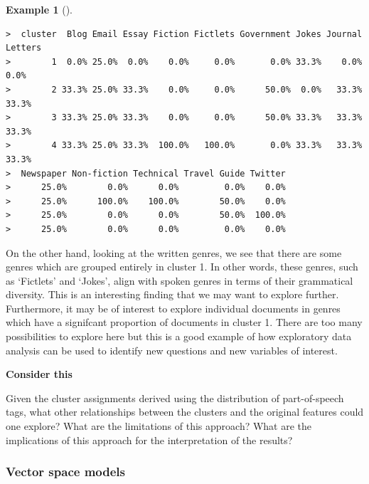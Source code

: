 \documentclass[
  letterpaper,
  DIV=11,
  numbers=noendperiod]{scrreport}
\theoremstyle{definition}
\newtheorem{example}{Example}[chapter]
\theoremstyle{remark}
\begin{document}
\begin{example}[]
\begin{verbatim}
>  cluster  Blog Email Essay Fiction Fictlets Government Jokes Journal Letters
>        1  0.0% 25.0%  0.0%    0.0%     0.0%       0.0% 33.3%    0.0%    0.0%
>        2 33.3% 25.0% 33.3%    0.0%     0.0%      50.0%  0.0%   33.3%   33.3%
>        3 33.3% 25.0% 33.3%    0.0%     0.0%      50.0% 33.3%   33.3%   33.3%
>        4 33.3% 25.0% 33.3%  100.0%   100.0%       0.0% 33.3%   33.3%   33.3%
>  Newspaper Non-fiction Technical Travel Guide Twitter
>      25.0%        0.0%      0.0%         0.0%    0.0%
>      25.0%      100.0%    100.0%        50.0%    0.0%
>      25.0%        0.0%      0.0%        50.0%  100.0%
>      25.0%        0.0%      0.0%         0.0%    0.0%
\end{verbatim}

\end{example}

On the other hand, looking at the written genres, we see that there are
some genres which are grouped entirely in cluster 1. In other words,
these genres, such as `Fictlets' and `Jokes', align with spoken genres
in terms of their grammatical diversity. This is an interesting finding
that we may want to explore further. Furthermore, it may be of interest
to explore individual documents in genres which have a signifcant
proportion of documents in cluster 1. There are too many possibilities
to explore here but this is a good example of how exploratory data
analysis can be used to identify new questions and new variables of
interest.

\begin{tcolorbox}[enhanced jigsaw, leftrule=.75mm, bottomrule=.15mm, opacityback=0, breakable, left=2mm, colback=white, toprule=.15mm, arc=.35mm, rightrule=.15mm]

\textbf{ Consider this}

Given the cluster assignments derived using the distribution of
part-of-speech tags, what other relationships between the clusters and
the original features could one explore? What are the limitations of
this approach? What are the implications of this approach for the
interpretation of the results?

\end{tcolorbox}

\hypertarget{sec-eda-vector-space-models}{%
\subsubsection{Vector space models}\label{sec-eda-vector-space-models}}
\end{document}
